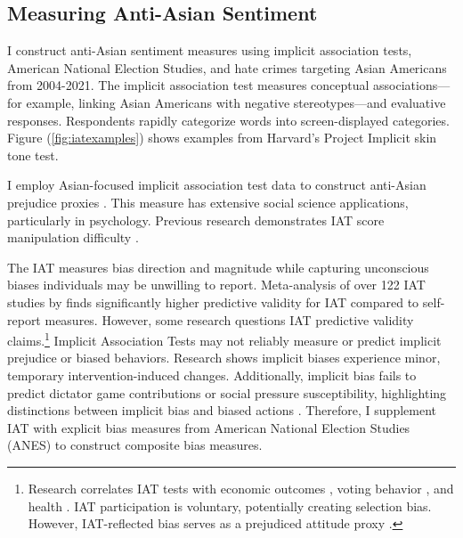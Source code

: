 \subsection{Measuring Anti-Asian Sentiment}\label{sub:lw-bias}

I construct anti-Asian sentiment measures using implicit association tests, American National Election Studies, and hate crimes targeting Asian Americans from 2004-2021. The implicit association test measures conceptual associations—for example, linking Asian Americans with negative stereotypes—and evaluative responses. Respondents rapidly categorize words into screen-displayed categories. Figure (\ref{fig:iatexamples}) shows examples from Harvard's Project Implicit skin tone test.

I employ Asian-focused implicit association test data to construct anti-Asian prejudice proxies \autocite{greenwaldMeasuringIndividualDifferences1998}. This measure has extensive social science applications, particularly in psychology. Previous research demonstrates IAT score manipulation difficulty \autocite{egloffPredictiveValidityImplicit2002}.

The IAT measures bias direction and magnitude while capturing unconscious biases individuals may be unwilling to report. Meta-analysis of over 122 IAT studies by \textcite{greenwaldMeasuringIndividualDifferences1998} finds significantly higher predictive validity for IAT compared to self-report measures. However, some research questions IAT predictive validity claims.\footnote{Research correlates IAT tests with economic outcomes \autocite{chettyRaceEconomicOpportunity2020,gloverDiscriminationSelfFulfillingProphecy2017}, voting behavior \autocite{friesePredictingVotingBehavior2007}, and health \autocite{leitnerRacialBiasAssociated2016}. IAT participation is voluntary, potentially creating selection bias. However, IAT-reflected bias serves as a prejudiced attitude proxy \autocite{chettyRaceEconomicOpportunity2020}.} Implicit Association Tests may not reliably measure or predict implicit prejudice or biased behaviors. Research shows implicit biases experience minor, temporary intervention-induced changes. Additionally, implicit bias fails to predict dictator game contributions or social pressure susceptibility, highlighting distinctions between implicit bias and biased actions \autocite{arkesAttributionsImplicitPrejudice2004,forscherMetaanalysisProceduresChange2019,leeDoesImplicitBias2018}. Therefore, I supplement IAT with explicit bias measures from American National Election Studies (ANES) to construct composite bias measures.


